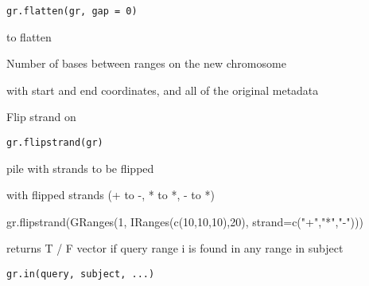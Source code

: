 \documentclass[a4paper]{book}
\begin{document}
%
\begin{Usage}
\begin{verbatim}
gr.flatten(gr, gap = 0)
\end{verbatim}
\end{Usage}
%
\begin{Arguments}
\begin{ldescription}
\item[\code{gr}]  to flatten

\item[\code{gap}] Number of bases between ranges on the new chromosome \code{[0]}
\end{ldescription}
\end{Arguments}
%
\begin{Value}
 with start and end coordinates, and all of the original metadata
\end{Value}
%
\begin{Description}\relax
Flip strand on 
\end{Description}
%
\begin{Usage}
\begin{verbatim}
gr.flipstrand(gr)
\end{verbatim}
\end{Usage}
%
\begin{Arguments}
\begin{ldescription}
\item[\code{gr}]  pile with strands to be flipped
\end{ldescription}
\end{Arguments}
%
\begin{Value}
 with flipped strands (+ to -, * to *, - to *)
\end{Value}
%
\begin{Examples}
\begin{ExampleCode}
gr.flipstrand(GRanges(1, IRanges(c(10,10,10),20), strand=c("+","*","-")))
\end{ExampleCode}
\end{Examples}
%
\begin{Description}\relax
returns T / F vector if query range i is found in any range in subject
\end{Description}
%
\begin{Usage}
\begin{verbatim}
gr.in(query, subject, ...)
\end{verbatim}
\end{Usage}
\end{document}
